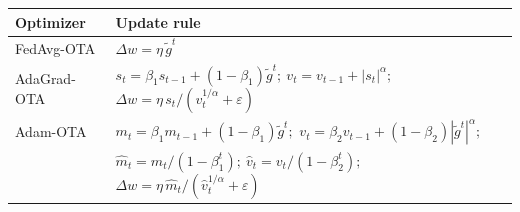 \begin{center}
\begin{tabular}{l|l}
\hline
Optimizer & Update rule \\
\hline
FedAvg-OTA     & $\Delta w = \eta\,\tilde g^t$ \\
AdaGrad-OTA    & $s_t=\beta_1 s_{t-1}+(1-\beta_1)\tilde g^t;\ v_t=v_{t-1}+|s_t|^\alpha;$
                $\Delta w = \eta\, s_t/(v_t^{1/\alpha}+\varepsilon)$ \\
Adam-OTA       & $m_t=\beta_1 m_{t-1}+(1-\beta_1)\tilde g^t;$
                $v_t=\beta_2 v_{t-1}+(1-\beta_2)|\tilde g^t|^\alpha;$\\
            &  $\hat m_t=m_t/(1-\beta_1^t);\ \hat v_t=v_t/(1-\beta_2^t);$
            $\Delta w = \eta\, \hat m_t/(\hat v_t^{1/\alpha}+\varepsilon)$ \\
\hline
\end{tabular}
\end{center}
